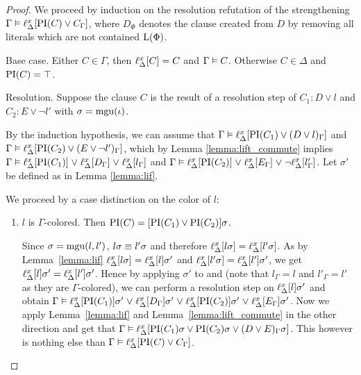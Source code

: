 \begin{proof}
	We proceed by induction on the resolution refutation of the strengthening $\Gamma \entails \lifdelta{\PI(C) \lor\nolinebreak C_\Gamma}$,
	where $D_\Phi$ denotes the clause created from $D$ by removing all literals which are not contained $\operatorname{L}(\Phi)$.

	\begin{description}
		\item{Base case.}
			Either $C \in \Gamma$, then $\ell_{\Delta}^{x}[C] = C$ and $\Gamma \vDash C$.
			Otherwise $C \in \Delta$ and $\operatorname{PI}(C) = \top$.

		\item{Resolution.}
			Suppose the clause $C$ is the result of a resolution step \inference{} of $C_1: D \lor l$ and $C_2: E \lor \lnot l'$ with $\sigma = \operatorname{mgu}(\iota)$.

			By the induction hypothesis, we can assume that
			$\Gamma \vDash \ell_{\Delta}^{x}[\operatorname{PI}(C_1) \lor (D\lor l)_\Gamma]$ and $\Gamma \vDash \ell_{\Delta}^{x}[\operatorname{PI}(C_2) \lor (E\lor \lnot l')_\Gamma]$,
			which by Lemma \ref{lemma:lift_commute} implies 
			\markA{} $\Gamma \vDash \ell_{\Delta}^{x}[\operatorname{PI}(C_1)] \;{\lor}\;\allowbreak \ell_{\Delta}^{x}[D_\Gamma] \;{\lor}\;\allowbreak \ell_{\Delta}^{x}[l_\Gamma]$ and \markB{} $\Gamma \vDash \ell_{\Delta}^{x}[\operatorname{PI}(C_2)] \;{\lor}\; \ell_{\Delta}^{x}[E_\Gamma] \;{\lor}\; \lnot \ell_{\Delta}^{x}[l'_\Gamma]$.
			Let $\sigma'$ be defined as in Lemma \ref{lemma:lif}.

			We proceed by a case distinction on the color of $l$:
			\begin{enumerate}
				\item $l$ is $\Gamma$-colored. Then $\operatorname{PI}(C) = [\operatorname{PI}(C_1\label{aou5jklah}) \lor \operatorname{PI}(C_2)]\sigma$.
					\label{aou5jklah}

					Since $\sigma = \operatorname{mgu}(l, l')$, $l\sigma \equiv l'\sigma$ and therefore $\ell_{\Delta}^{x}[l\sigma] = \ell_{\Delta}^{x}[l'\sigma]$.
					As by Lemma~\ref{lemma:lif} $\ell_{\Delta}^{x}[l\sigma] = \ell_{\Delta}^{x}[l]\sigma'$ and $\ell_{\Delta}^{x}[l'\sigma] = \ell_{\Delta}^{x}[l']\sigma'$,
					we get $\ell_{\Delta}^{x}[l]\sigma' = \ell_{\Delta}^{x}[l']\sigma'$.
					Hence by applying $\sigma'$ to \markA{} and \markB{} (note that $l_\Gamma = l$ and $l'_\Gamma = l'$ as they are $\Gamma$-colored), we can perform a resolution step on $\ell_{\Delta}^{x}[l]\sigma'$ and obtain
					$\Gamma \vDash \ell_{\Delta}^{x}[\operatorname{PI}(C_1)]\sigma' \;{\lor}\; \ell_{\Delta}^{x}[D_\Gamma] \sigma' \;{\lor}\; \ell_{\Delta}^{x}[\operatorname{PI}(C_2)]\sigma' \;{\lor}\; \ell_{\Delta}^{x}[E_\Gamma] \sigma'$.
					Now we apply Lemma~\ref{lemma:lif} and Lemma~\ref{lemma:lift_commute} in the other direction 
					and get that 
					$\Gamma \vDash \ell_{\Delta}^{x}[\operatorname{PI}(C_1)\sigma \lor \operatorname{PI}(C_2)\sigma \lor\allowbreak (D \lor E)_\Gamma \sigma]$.
					This however is nothing else than 
					$\Gamma \vDash \ell_{\Delta}^{x}[\operatorname{PI}(C) \lor C_\Gamma]$.


\end{enumerate}
\end{description}
\end{proof}
